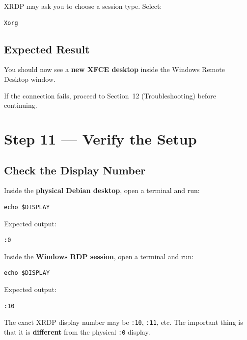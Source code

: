 \documentclass[a4paper,12pt]{article}
\newcommand{\code}[1]{\texttt{\small #1}}
\begin{document}
XRDP may ask you to choose a session type. Select:

\begin{lstlisting}[style=textstyle]
Xorg
\end{lstlisting}

\subsection{Expected Result}

You should now see a \textbf{new XFCE desktop} inside the Windows Remote Desktop window.

\begin{tipbox}
If the connection fails, proceed to Section~12 (Troubleshooting) before continuing.
\end{tipbox}

\section{Step 11 --- Verify the Setup}

\subsection{Check the Display Number}

Inside the \textbf{physical Debian desktop}, open a terminal and run:

\begin{lstlisting}[style=bashstyle]
echo $DISPLAY
\end{lstlisting}

Expected output:

\begin{lstlisting}[style=textstyle]
:0
\end{lstlisting}

Inside the \textbf{Windows RDP session}, open a terminal and run:

\begin{lstlisting}[style=bashstyle]
echo $DISPLAY
\end{lstlisting}

Expected output:

\begin{lstlisting}[style=textstyle]
:10
\end{lstlisting}

\begin{notebox}
The exact XRDP display number may be \code{:10}, \code{:11}, etc. The important thing is that it is \textbf{different} from the physical \code{:0} display.
\end{notebox}
\end{document}
